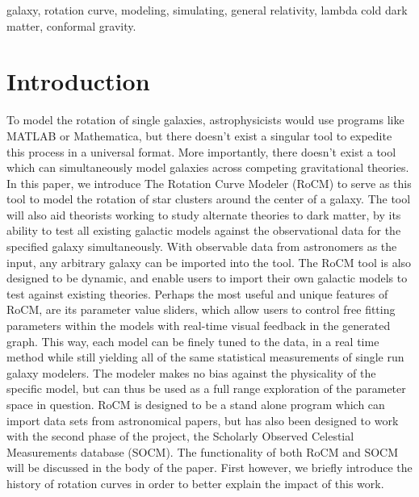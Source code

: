 \documentclass[conference]{IEEEtran-modified}
\begin{document}
	
\begin{IEEEkeywords}
\begin{center}
galaxy, rotation curve, modeling, simulating, general relativity, lambda cold dark matter, conformal gravity.
\end{center}	
\end{IEEEkeywords}
	
	
\IEEEpeerreviewmaketitle

\thispagestyle{plain}
\pagestyle{plain}


\section{Introduction}
To model the rotation of single galaxies, astrophysicists would use programs like MATLAB or Mathematica, but there doesn't exist a singular tool to expedite this process in a universal format.   More importantly, there doesn't exist a tool which can simultaneously model galaxies across competing gravitational theories.  In this paper, we introduce The Rotation Curve Modeler (RoCM) to serve as this tool to model the rotation of star clusters around the center of a galaxy. The tool will also aid theorists working to study alternate theories to dark matter, by its ability to test all existing galactic models against the observational data for the specified galaxy simultaneously. With observable data from astronomers as the input, any arbitrary galaxy can be imported into the tool. The RoCM tool is also designed to be dynamic, and enable users to import their own galactic models to test against existing theories.  Perhaps the most useful and unique features of RoCM, are its parameter value sliders, which allow users to control free fitting parameters within the models with real-time visual feedback in the generated graph. This way, each model can be finely tuned to the data, in a real time method while still yielding all of the same statistical measurements of single run galaxy modelers. The modeler makes no bias against the physicality of the specific model, but can thus be used as a full range exploration of the parameter space in question.  RoCM is designed to be a stand alone program which can import data sets from astronomical papers, but has also been designed to work with the second phase of the project, the Scholarly Observed Celestial Measurements database (SOCM). The functionality of both RoCM and SOCM will be discussed in the body of the paper.  First however, we briefly introduce the history of rotation curves in order to better explain the impact of this work.
\end{document}
